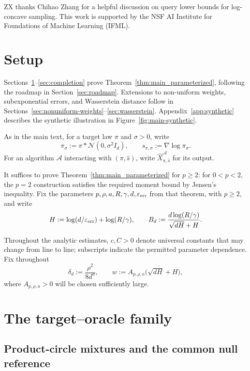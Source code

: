 \documentclass[11pt,letterpaper]{article}
\newcommand{\eps}{\varepsilon}
\newcommand{\1}{\mathbbm{1}}
\newcommand{\cN}{\mathcal N}
\begin{document}
ZX thanks Chihao Zhang for a helpful discussion on query lower bounds for log-concave sampling.
This work is supported by the NSF AI Institute for Foundations of Machine Learning (IFML).



\onecolumn
\appendix

\renewcommand{\eps}{\varepsilon_{\rm err}}

\section{Setup}
\label{sec:main-proof-setup}

Sections~\ref{sec:main-proof-setup}--\ref{sec:completion} prove
Theorem~\ref{thm:main_parameterized}, following the roadmap in
Section~\ref{sec:roadmap}.
Extensions to non-uniform weights, subexponential errors, and
Wasserstein distance follow in
Sections~\ref{sec:nonuniform-weights}--\ref{sec:wasserstein}.
Appendix~\ref{app:synthetic} describes the synthetic illustration in
Figure~\ref{fig:main-synthetic}.

As in the main text, for a target law \(\pi\) and \(\sigma>0\), write
\[
   \pi_\sigma:=\pi*\cN(0,\sigma^2I_d),
   \qquad
   s_{\pi,\sigma}:=\nabla\log\pi_\sigma .
\]
For an algorithm \(\mathcal A\) interacting with \((\pi,\widehat s)\),
write \(\widehat X_{\pi,\widehat s}^{\mathcal A}\) for its output.

It suffices to prove Theorem~\ref{thm:main_parameterized} for \(p\ge2\):
for \(0<p<2\), the \(p=2\) construction satisfies the required moment
bound by Jensen's inequality.
Fix the parameters \(p,\rho,a,R,\gamma,d,\eps\) from that theorem,
with \(p\ge2\), and write
\[
   H:=\log(d/\eps)+\log(R/\gamma),
   \qquad
   B_d:=\frac{d\log(R/\gamma)}{\sqrt{dH}+H}.
\]

Throughout the analytic estimates, \(c,C>0\) denote universal
constants that may change from line to line; subscripts indicate
the permitted parameter dependence.
Fix throughout
\[
   \delta_d:=\frac{\rho^2}{8d^a},
   \qquad
   w:=A_{p,\rho,a}\bigl(\sqrt{dH}+H\bigr),
\]
where \(A_{p,\rho,a}>0\) will be chosen sufficiently large.

\section{The target--oracle family}
\label{sec:hard-family}

\subsection{Product-circle mixtures and the common null reference}
\end{document}
